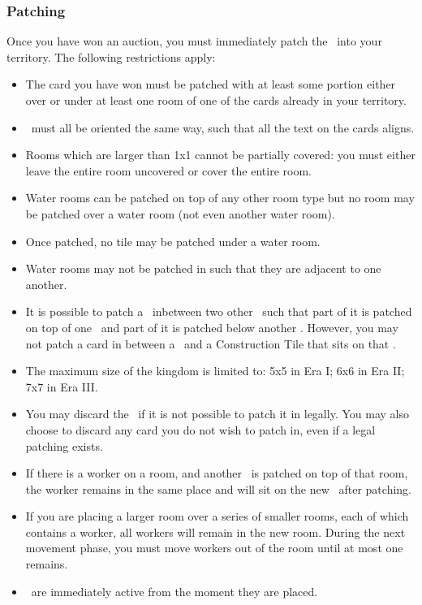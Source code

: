 \documentclass[10pt,twocolumn]{article}
\begin{document}
\subsubsection{Patching \landcards}
Once you have won an auction, you must immediately patch the \landcard\ into your territory. The following restrictions apply:
\begin{itemize}
\item The card you have won must be patched with at least some portion either over or under at least one room of one of the cards already in your territory.
\item \landcards\ must all be oriented the same way, such that all the text on the cards aligns.
\item Rooms which are larger than 1x1 cannot be partially covered: you must either leave the entire room uncovered or cover the entire room.
\end{itemize}
\begin{itemize}
\item Water rooms can be patched on top of any other room type but no room may be patched over a water room (not even another water room).
\end{itemize}
\begin{itemize}
\item Once patched, no tile may be patched under a water room.
\item Water rooms may not be patched in such that they are adjacent to one another.
\item It is possible to patch a \landcard\ inbetween two other \landcards\ such that part of it is patched on top of one \landcard\ and part of it is patched below another \landcard. However, you may not patch a card in between a \landcard\ and a Construction Tile that sits on that \landcard.
\end{itemize}
\begin{itemize}
\item The maximum size of the kingdom is limited to: 5x5 in Era I; 6x6 in Era II; 7x7 in Era III.
\end{itemize}
\begin{itemize}
\item You may discard the \landcard\ if it is not possible to patch it in legally. You may also choose to discard any card you do not wish to patch in, even if a legal patching exists.
\item If there is a worker on a room, and another \landcard\ is patched on top of that room, the worker remains in the same place and will sit on the new \landcard\ after patching.
\item If you are placing a larger room over a series of smaller rooms, each of which contains a worker, all workers will remain in the new room. During the next movement phase, you must move workers out of the room until at most one remains.
\item \landcards\ are immediately active from the moment they are placed.
\end{itemize}
\end{document}
